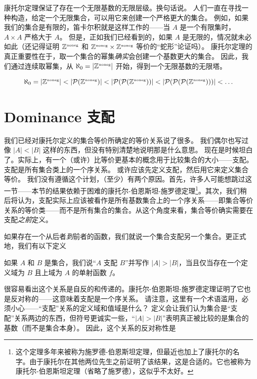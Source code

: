 康托尔定理保证了存在一个无限基数的无限层级。换句话说。
人们一直在寻找一种构造，给定一个无限集合，可以用它来创建一个严格更大的集合。
例如，如果我们的集合是有限的，笛卡尔积就是这样工作的——当 $A$ 是一个有限集时，$A \times A$ 严格大于 $A$。
但是，正如我们已经看到的，如果 $A$ 是无限的，情况就未必如此（还记得证明 ${\mathbb Z}^{\mbox{\tiny noneg}}$ 和 ${\mathbb Z}^{\mbox{\tiny noneg}} \times {\mathbb Z}^{\mbox{\tiny noneg}}$ 等价的“蛇形”论证吗）。
康托尔定理的真正重要性在于，取一个集合的幂集\emph{确实}会创建一个基数更大的集合。
因此，我们通过连续取幂集，从 $\aleph_0 = |{\mathbb Z}^{\mbox{\tiny noneg}}|$ 开始，得到一个无限基数的无限塔。

\[ \aleph_0  = |{\mathbb Z}^{\mbox{\tiny noneg}}| < |{\mathcal P}({\mathbb Z}^{\mbox{\tiny noneg}})| < |{\mathcal P}({\mathcal P}({\mathbb Z}^{\mbox{\tiny noneg}}))| < |{\mathcal P}({\mathcal P}({\mathcal P}({\mathbb Z}^{\mbox{\tiny noneg}})))|
    < \ldots \]

\clearpage




\newpage

\section{Dominance 支配}
\label{sec:dominance}

我们已经对康托尔定义的集合等价所确定的等价关系说了很多。
我们偶尔也写过像 $|A| < |B|$ 这样的东西，但没有特别清楚地说明那是什么意思。
现在是时候坦白了。实际上，有一个（或许）比等价更基本的概念用于比较集合的大小——支配。
支配是所有集合类上的一个序关系。
或许应该先定义支配，然后用它来定义集合等价。
我们没有遵循这个计划，（至少）有两个原因。首先，许多人可能想跳过这一节——本节的结果依赖于困难的康托尔-伯恩斯坦-施罗德定理\footnote{这个定理多年来被称为施罗德-伯恩斯坦定理，但最近也加上了康托尔的名字。由于康托尔在其他两位先生之前证明了该结果，这是合适的。它也被称为康托尔-伯恩斯坦定理（省略了施罗德），这似乎不太好。}。其次，我们稍后将认为，支配实际上应该被看作是所有基数集合上的一个序关系——即集合等价关系的等价类——而不是所有集合的集合。从这个角度来看，集合等价确实需要在支配\emph{之前}定义。

如果存在一个从后者\emph{到}前者的函数，我们就说一个集合支配另一个集合。更正式地，我们有以下定义

\begin{defi}  如果 $A$ 和 $B$ 是集合，我们说“$A$ 支配 $B$”并写作 $|A| > |B|$，当且仅当存在一个定义域为 $B$ 且上域为 $A$ 的单射函数 $f$。
\end{defi}

很容易看出这个关系是自反的和传递的。康托尔-伯恩斯坦-施罗德定理证明了它也是反对称的——这意味着支配是一个序关系。
请注意，这里有一个术语滥用，必须小心——“支配”关系的定义域和值域是什么？
定义会让我们认为集合是“支配”关系两边的东西，但符号更诚实一些，“$|A| > |B|$”表明真正被比较的是集合的基数（而不是集合本身）。
因此，这个关系的反对称性是

